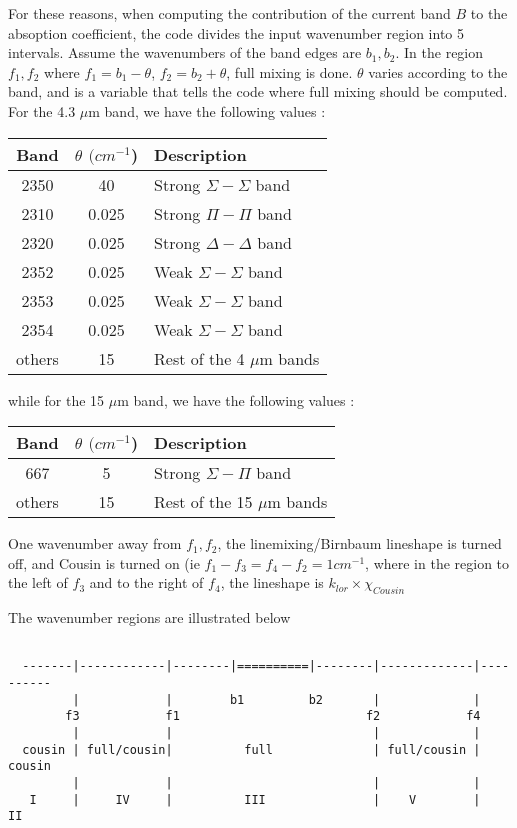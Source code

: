 \documentclass[11pt]{article}
\begin{document}
For these reasons, when computing the contribution of the current band $B$ to 
the absoption coefficient, the code divides the input wavenumber region into 
5 intervals. Assume the wavenumbers of the band edges are $b_{1},b_{2}$. 
In the region $f_{1},f_{2}$ where $f_{1} = b_{1} - \theta$,
$f_{2} = b_{2} + \theta $, full mixing is done. $\theta$ varies according to 
the band, and is a variable that tells the code where full mixing should
be computed. For the 4.3 $\mu$m band, we have the following values :
\begin{longtable}{ccl}
\hline
\hline
Band & $\theta$ $(cm^{-1}$) & Description \\
\hline
\hline
2350 &    40            &Strong $\Sigma-\Sigma$ band \\
2310 &    0.025         &Strong $\Pi-\Pi$ band \\
2320 &    0.025         &Strong $\Delta-\Delta$ band \\
2352 &    0.025         &Weak $\Sigma-\Sigma$ band \\
2353 &    0.025         &Weak $\Sigma-\Sigma$ band \\
2354 &    0.025         &Weak $\Sigma-\Sigma$ band \\
others &  15            &Rest of the 4 $\mu$m bands\\
\hline
\hline
\end{longtable}

while for the 15 $\mu$m band, we have the following values :
\begin{longtable}{ccl}
\hline
\hline
Band & $\theta$ $(cm^{-1}$) & Description \\
\hline
\hline
667     & 5              & Strong $\Sigma-\Pi$ band \\
others  & 15             & Rest of the 15 $\mu$m bands\\
\hline
\hline
\end{longtable}

One wavenumber away from $f_{1},f_{2}$, the linemixing/Birnbaum lineshape is 
turned off, and Cousin is turned on (ie $f_{1}-f_{3}=f_{4}-f_{2} = 1 cm^{-1}$,
where in the region to the left of $f_{3}$ and to the right of $f_{4}$, the 
lineshape is $k_{lor} \times \chi_{Cousin}$

The wavenumber regions are illustrated below

\begin{verbatim}

  -------|------------|--------|==========|--------|-------------|----------
         |            |        b1         b2       |             |
        f3            f1                          f2            f4
         |            |                            |             | 
  cousin | full/cousin|          full              | full/cousin |  cousin    
         |            |                            |             | 
   I     |     IV     |          III               |    V        |    II

\end{verbatim}
\end{document}
